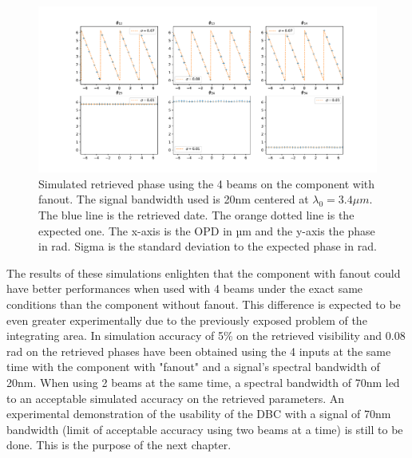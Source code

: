 \begin{figure}[htbp!]
\centering
\includegraphics[scale=.4]{../picture/4BL_20_fan_phase.pdf}
\caption{Simulated retrieved phase using the 4 beams on the component with fanout. The signal bandwidth used is 20nm centered at $ \lambda_0=3.4 \mu m$. The blue line is the retrieved date. The orange dotted line is the expected one. The x-axis is the OPD in µm and the y-axis the phase in rad. Sigma is the standard deviation to the expected phase in rad.}
\label{fig:4BL_sim_fan_phase}
\end{figure}



The results of these simulations enlighten that the component with fanout could have better performances when used with 4 beams under the exact same conditions than the component without fanout. This difference is expected to be even greater experimentally due to the previously exposed problem of the integrating area. In simulation accuracy of 5\% on the retrieved visibility and 0.08 rad on the retrieved phases have been obtained using the 4 inputs at the same time with the component with "fanout" and a signal's spectral bandwidth of 20nm. When using 2 beams at the same time, a spectral bandwidth of 70nm led to an acceptable simulated accuracy on the retrieved parameters. 
An experimental demonstration of the usability of the DBC with a signal of 70nm bandwidth (limit of acceptable accuracy using two beams at a time) is still to be done. This is the purpose of the next chapter.
